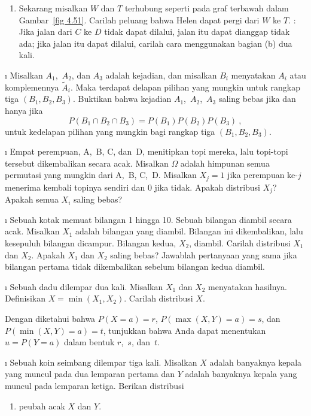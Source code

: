 \begin{LJSItem}
\begin{enumerate}
\item Sekarang misalkan $W$ dan $T$ terhubung seperti pada graf terbawah dalam Gambar~\ref{fig 4.51}.
Carilah peluang bahwa Helen dapat pergi dari $W$ ke $T$.  : Jika
jalan dari $C$ ke $D$ tidak dapat dilalui, jalan itu dapat dianggap tidak ada; jika jalan itu
dapat dilalui, carilah cara menggunakan bagian (b) dua kali.
\end{enumerate}



\i\label{exer 4.1.31} Misalkan $A_1$,~$A_2$, dan $A_3$ adalah kejadian, dan misalkan $B_i$ menyatakan
$A_i$ atau komplemennya $\tilde A_i$.  Maka terdapat delapan pilihan yang mungkin untuk
rangkap tiga $(B_1, B_2, B_3)$.  Buktikan bahwa kejadian $A_1$,~$A_2$,~$A_3$ saling bebas jika dan
hanya jika $$P(B_1 \cap B_2 \cap B_3) = P(B_1)P(B_2)P(B_3)\ ,$$
untuk kedelapan pilihan yang mungkin bagi rangkap tiga $(B_1, B_2, B_3)$.

\i\label{exer 5.1.4} Empat perempuan, A,~B, C, dan~D, menitipkan topi mereka, lalu topi-topi tersebut dikembalikan
secara acak.  Misalkan $\Omega$ adalah himpunan semua permutasi yang mungkin dari A,~B, C,~D.  Misalkan
$X_j = 1$ jika perempuan ke-$j$ menerima kembali topinya sendiri dan 0 jika tidak.  Apakah
distribusi $X_j$?  Apakah semua $X_i$ saling bebas?

\i\label{exer 5.1.5} Sebuah kotak memuat bilangan 1 hingga 10.  Sebuah bilangan diambil secara acak.  Misalkan
$X_1$ adalah bilangan yang diambil.  Bilangan ini dikembalikan, lalu kesepuluh bilangan dicampur.  Bilangan kedua,
$X_2$, diambil.  Carilah distribusi $X_1$ dan $X_2$.  Apakah
$X_1$ dan $X_2$ saling bebas?  Jawablah pertanyaan yang sama jika bilangan pertama tidak dikembalikan
sebelum bilangan kedua diambil.

\i\label{exer 5.1.6} Sebuah dadu dilempar dua kali.  Misalkan $X_1$ dan $X_2$ menyatakan hasilnya. 
Definisikan $X = \min(X_1, X_2)$.  Carilah distribusi $X$.

\istar\label{exer 5.1.7} \begin{sloppypar} Dengan diketahui bahwa $P(X = a) = r$, $P(\max(X,Y) = a) = s$,
dan  
$P(\min(X,Y) = a) = t$, tunjukkan bahwa Anda dapat menentukan $u = P(Y = a)$ dalam bentuk $r$,~$s$,
dan~$t$.\end{sloppypar}

\i\label{exer 5.1.8} Sebuah koin seimbang dilempar tiga kali.  Misalkan $X$ adalah banyaknya kepala yang
muncul pada dua lemparan pertama dan $Y$ adalah banyaknya kepala yang muncul pada lemparan ketiga. 
Berikan distribusi
\begin{enumerate}
\item peubah acak $X$ dan $Y$.


\end{enumerate}
\end{LJSItem}
